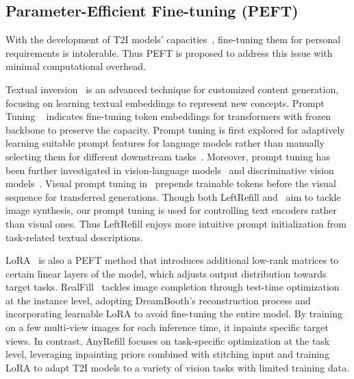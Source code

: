 \subsection{Parameter-Efficient Fine-tuning (PEFT)}
With the development of T2I models' capacities~\cite{podell2024sdxl,esser2024scaling,flux2024}, fine-tuning them for personal requirements is intolerable. Thus PEFT is proposed to address this issue with minimal computational overhead.

Textual inversion~\cite{gal2022image,mokady2022null} is an advanced technique for customized content generation, focusing on learning textual embeddings to represent new concepts. Prompt Tuning ~\cite{lester2021power,liu2021gpt,liu2021p} indicates fine-tuning token embeddings for transformers with frozen backbone to preserve the capacity. Prompt tuning is first explored for adaptively learning suitable prompt features for language models rather than manually selecting them for different downstream tasks~\cite{liu2023pre}. Moreover, prompt tuning has been further investigated in vision-language models~\cite{radford2021learning,ge2022domain} and discriminative vision models~\cite{jia2022visual,liao2023rethinking}.
Visual prompt tuning in~\cite{sohn2022visual} prepends trainable tokens before the visual sequence for transferred generations. 
Though both LeftRefill and~\cite{sohn2022visual} aim to tackle image synthesis, our prompt tuning is used for controlling text encoders rather than visual ones. 
Thus LeftRefill enjoys more intuitive prompt initialization from task-related textual descriptions.

LoRA~\cite{hu2021lora} is also a PEFT method that introduces additional low-rank matrices to certain linear layers of the model, which adjusts output distribution towards target tasks. RealFill~\cite{tang2024realfill} tackles image completion through test-time optimization at the instance level, adopting DreamBooth’s reconstruction process and incorporating learnable LoRA to avoid fine-tuning the entire model. By training on a few multi-view images for each inference time, it inpaints specific target views. In contrast, AnyRefill focuses on task-specific optimization at the task level, leveraging inpainting priors combined with stitching input and training LoRA to adapt T2I models to a variety of vision tasks with limited training data.


